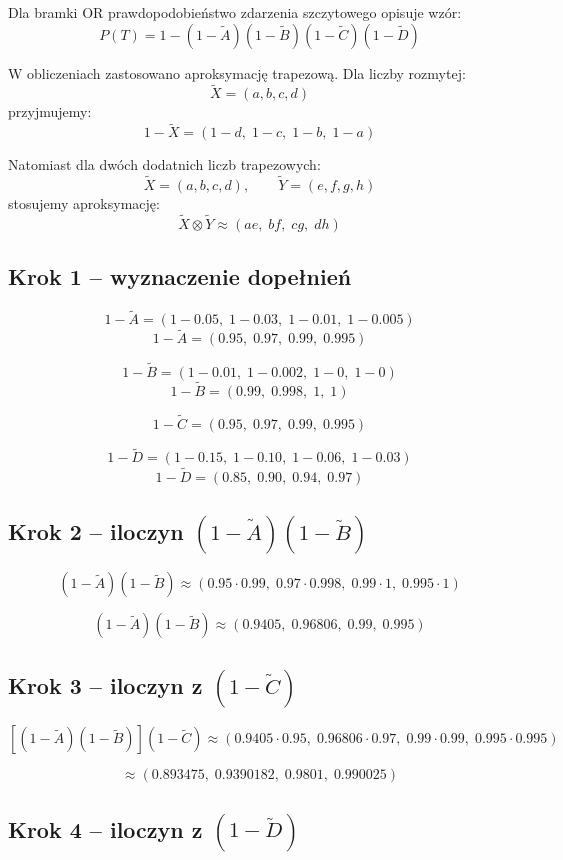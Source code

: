 \documentclass[11pt,a4paper]{article}
\begin{document}
Dla bramki OR prawdopodobieństwo zdarzenia szczytowego opisuje wzór:
\[
P(T)=1-(1-\tilde{A})(1-\tilde{B})(1-\tilde{C})(1-\tilde{D})
\]

W obliczeniach zastosowano aproksymację trapezową. Dla liczby rozmytej:
\[
\tilde{X}=(a,b,c,d)
\]
przyjmujemy:
\[
1-\tilde{X}=(1-d,\;1-c,\;1-b,\;1-a)
\]

Natomiast dla dwóch dodatnich liczb trapezowych:
\[
\tilde{X}=(a,b,c,d), \qquad \tilde{Y}=(e,f,g,h)
\]
stosujemy aproksymację:
\[
\tilde{X}\otimes\tilde{Y}\approx(ae,\;bf,\;cg,\;dh)
\]

\subsection{Krok 1 -- wyznaczenie dopełnień}

\[
1-\tilde{A}=(1-0.05,\;1-0.03,\;1-0.01,\;1-0.005)
\]
\[
1-\tilde{A}=(0.95,\;0.97,\;0.99,\;0.995)
\]

\[
1-\tilde{B}=(1-0.01,\;1-0.002,\;1-0,\;1-0)
\]
\[
1-\tilde{B}=(0.99,\;0.998,\;1,\;1)
\]

\[
1-\tilde{C}=(0.95,\;0.97,\;0.99,\;0.995)
\]

\[
1-\tilde{D}=(1-0.15,\;1-0.10,\;1-0.06,\;1-0.03)
\]
\[
1-\tilde{D}=(0.85,\;0.90,\;0.94,\;0.97)
\]

\subsection{Krok 2 -- iloczyn $(1-\tilde{A})(1-\tilde{B})$}

\[
(1-\tilde{A})(1-\tilde{B}) \approx
(0.95\cdot0.99,\;0.97\cdot0.998,\;0.99\cdot1,\;0.995\cdot1)
\]

\[
(1-\tilde{A})(1-\tilde{B}) \approx
(0.9405,\;0.96806,\;0.99,\;0.995)
\]

\subsection{Krok 3 -- iloczyn z $(1-\tilde{C})$}

\[
[(1-\tilde{A})(1-\tilde{B})](1-\tilde{C}) \approx
(0.9405\cdot0.95,\;0.96806\cdot0.97,\;0.99\cdot0.99,\;0.995\cdot0.995)
\]

\[
\approx
(0.893475,\;0.9390182,\;0.9801,\;0.990025)
\]

\subsection{Krok 4 -- iloczyn z $(1-\tilde{D})$}
\end{document}
